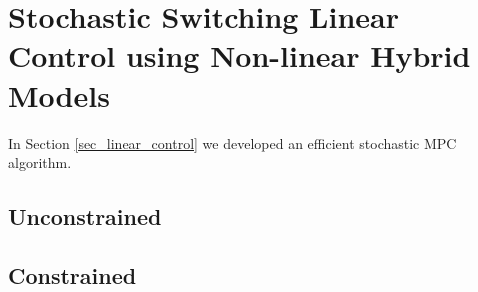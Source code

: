 \section{Stochastic Switching Linear Control using Non-linear Hybrid Models}
\label{sec_rbpf_control}
In Section \ref{sec_linear_control} we developed an efficient stochastic MPC algorithm.

\subsection{Unconstrained}

\subsection{Constrained} 


